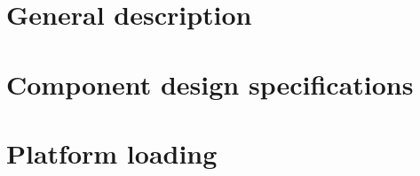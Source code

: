 \documentclass[a4paper,twoside,openright,makeidx,12pt]{book}
\begin{document}
\pagestyle{empty}
\renewcommand{\arraystretch}{1.8}



\tableofcontents


\pagestyle{fancy}
\clearpage

\newpage
{}
\chapter{General description}
\label{Sec:DDD-GeneralDescription}


%


%


\newpage
\chapter{Component design specifications}
\label{Sec:DDD-ComponentDesignSpecifications}



\newpage
\chapter{Platform loading}
\label{Sec:DDD-Loading}



\end{document}
